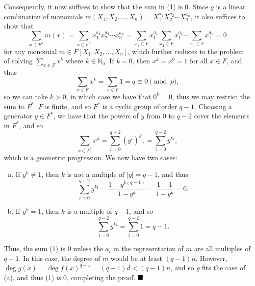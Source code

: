 \documentclass[12pt]{article}
\newcommand{\N}{\ensuremath{\mathbb{N}}}
\newcommand{\vertb}[1]{\left\vert#1\right\vert}
\newcommand{\done}{\ensuremath{\strut\hfill\blacksquare}}
\begin{document}
Consequently, it now suffices to show that the sum in (1) is 0.
Since \( g \) is a linear combination of monomials
\( m(X_1, X_2, \dots, X_n) =X_1^{a_1}X_2^{a_2} \cdots X_n^{a_n} \), it also
suffices to show that
\[
	\sum_{x \in F^n} m(x)
	= \sum_{x \in F^n} x_1^{a_1}x_2^{a_2} \cdots x_n^{a_n}
	= \sum_{x_1 \in F} x_1^{a_1}
	\sum_{x_2 \in F} x_1^{a_2}
	\cdots
	\sum_{x_n \in F} x_1^{a_n}
	= 0
\]
for any monomial \( m \in F[X_1, X_2, \dots, X_n] \), which further reduces
to the problem of solving \( \sum_{x \in F} x^k \) where \( k \in \N_0 \).
If \( k = 0 \), then \( x^k = x^0 = 1 \) for all \( x \in F \), and
thus
\[
	\sum_{x \in F} x^k = \sum_{x \in F} 1 = q \equiv 0 \pmod{p},
\]
so we can take \( k > 0 \), in which case we have that \( 0^k = 0 \), thus
we may restrict the sum to \( F^* \).
\( F \) is finite, and so \( F^* \) is a cyclic group of order \( q - 1 \).
Choosing a generator \( y \in F^* \), we have that the powers of \( y \) from
0 to \( q - 2 \) cover the elements in \( F^* \), and so
\[
	\sum_{x \in F^*} x^k
	= \sum_{i = 0}^{q - 2} (y^i)^k,
	= \sum_{i = 0}^{q - 2} y^{ki},
\]
which is a geometric progression.
We now have two cases:
\begin{enumerate}[(a)]
	\item If \( y^k \ne 1 \), then \( k \) is not a multiple of
	      \( \vertb{y} = q - 1 \), and thus
	      \[
		      \sum_{i = 0}^{q - 2} y^{ki}
		      = \frac{1 - y^{k(q - 1)}}{1 - y^k}
		      = \frac{1 - 1}{1 - y^k}
		      = 0.
	      \]

	\item If \( y^k = 1 \), then \( k \) is a multiple of \( q - 1 \),
	      and so
	      \[
		      \sum_{i = 0}^{q - 2} y^{ki}
		      = \sum_{i = 0}^{q - 2} 1
		      = q - 1.
	      \]
\end{enumerate}
Thus, the sum (1) is 0 unless the \( a_i \) in the representation of \( m \)
are all multiples of \( q - 1 \).
In this case, the degree of \( m \) would be at least \( (q - 1)n \).
However, \( \deg g(x) = \deg f(x)^{q - 1} = (q - 1)d < (q - 1)n \), and so
\( g \) fits the case of (a), and thus (1) is 0, completing the proof.
\done
\end{document}
